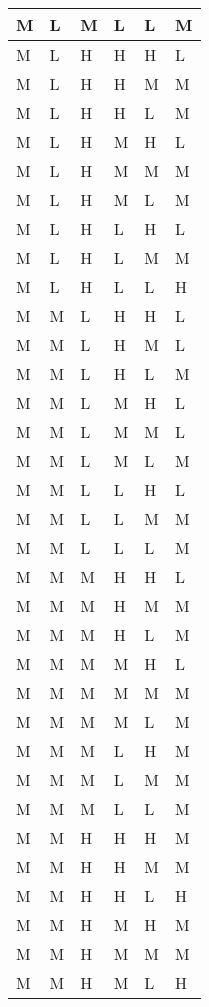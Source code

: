 \begin{center}
\begin{longtable}{| l | l | l | l | l | l |}
    M & L & M & L & L & M \\ \hline 
    M & L & H & H & H & L \\ \hline 
    M & L & H & H & M & M \\ \hline 
    M & L & H & H & L & M \\ \hline 
    M & L & H & M & H & L \\ \hline 
    M & L & H & M & M & M \\ \hline 
    M & L & H & M & L & M \\ \hline 
    M & L & H & L & H & L \\ \hline 
    M & L & H & L & M & M \\ \hline 
    M & L & H & L & L & H \\ \hline 
    M & M & L & H & H & L \\ \hline 
    M & M & L & H & M & L \\ \hline 
    M & M & L & H & L & M \\ \hline 
    M & M & L & M & H & L \\ \hline 
    M & M & L & M & M & L \\ \hline 
    M & M & L & M & L & M \\ \hline 
    M & M & L & L & H & L \\ \hline 
    M & M & L & L & M & M \\ \hline 
    M & M & L & L & L & M \\ \hline 
    M & M & M & H & H & L \\ \hline 
    M & M & M & H & M & M \\ \hline 
    M & M & M & H & L & M \\ \hline 
    M & M & M & M & H & L \\ \hline 
    M & M & M & M & M & M \\ \hline 
    M & M & M & M & L & M \\ \hline 
    M & M & M & L & H & M \\ \hline 
    M & M & M & L & M & M \\ \hline 
    M & M & M & L & L & M \\ \hline 
    M & M & H & H & H & M \\ \hline 
    M & M & H & H & M & M \\ \hline 
    M & M & H & H & L & H \\ \hline 
    M & M & H & M & H & M \\ \hline 
    M & M & H & M & M & M \\ \hline 
    M & M & H & M & L & H \\ \hline 

\end{longtable}
\end{center}
